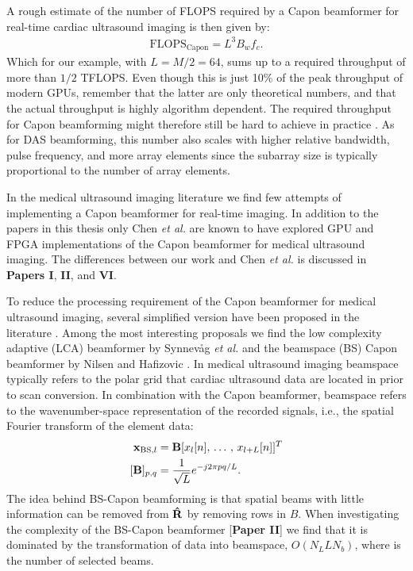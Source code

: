 A rough estimate of the number of FLOPS required by a Capon beamformer for real-time cardiac ultrasound imaging is then given by:
\begin{align}
\text{FLOPS}_{\text{Capon}} = L^3B_wf_c.
\end{align}
Which for our example, with $L=M/2=64$, sums up to a required throughput of more than $1/2$ TFLOPS. Even though this is just 10\% of the peak throughput of modern GPUs, remember that the latter are only theoretical numbers, and that the actual throughput is highly algorithm dependent. The required throughput for Capon beamforming might therefore still be hard to achieve in practice \cite[\textbf{Paper II}]{So2011}. As for DAS beamforming, this number also scales with higher relative bandwidth, pulse frequency, and more array elements since the subarray size is typically proportional to the number of array elements. 

In the medical ultrasound imaging literature we find few attempts of implementing a Capon beamformer for real-time imaging. In addition to the papers in this thesis only Chen \textit{et al.} \cite{Chen2011, Chen, Chen2011a} are known to have explored GPU and FPGA implementations of the Capon beamformer for medical ultrasound imaging. The differences between our work and Chen \textit{et al.} is discussed in \textbf{Papers I}, \textbf{II}, and \textbf{VI}.

To reduce the processing requirement of the Capon beamformer for medical ultrasound imaging, several simplified version have been proposed in the literature \cite{Asl2012, Kim}. Among the most interesting proposals we find the low complexity adaptive (LCA) beamformer by Synnev\aa{}g \textit{et al.} \cite{Synnevag2011} and the beamspace (BS) Capon beamformer by Nilsen and Hafizovic \cite{Nilsen2009}. In medical ultrasound imaging beamspace typically refers to the polar grid that cardiac ultrasound data are located in prior to scan conversion. In combination with the Capon beamformer, beamspace refers to the wavenumber-space representation of the recorded signals, i.e., the spatial Fourier transform of the element data: 
\begin{align}
\vec{x}_{\text{BS},l} &= \mat{B}[x_l[n],\,\dotso,\,x_{l+L}[n]]^T\\
[\mat{B}]_{p,q} &= \frac{1}{\sqrt{L}}e^{-j 2 \pi p q / L}.
\end{align}
The idea behind BS-Capon beamforming is that spatial beams with little information can be removed from $\mathbf{\hat{R}}$ by removing rows in $B$. When investigating the complexity of the BS-Capon beamformer [\textbf{Paper II}] we find that it is dominated by the transformation of data into beamspace, $O(N_LLN_b)$, where  is the number of selected beams. 

